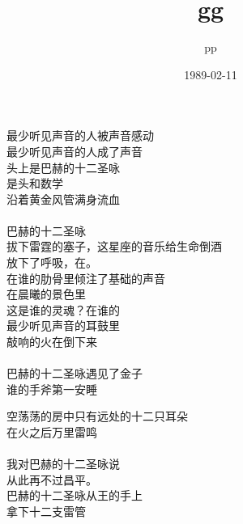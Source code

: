 \documentclass{article}
\title{gg}
\author{pp}
\date{1989-02-11}
\begin{document}

\maketitle

\setlength\parindent{0pt}

\begin{center}

\begin{minipage}{0.5\linewidth}

\Large

﻿最少听见声音的人被声音感动 \\
最少听见声音的人成了声音 \\
头上是巴赫的十二圣咏 \\
是头和数学 \\
沿着黄金风管满身流血 \\
 \\
巴赫的十二圣咏 \\
拔下雷霆的塞子，这星座的音乐给生命倒酒 \\
放下了呼吸，在。 \\
在谁的肋骨里倾注了基础的声音 \\
在晨曦的景色里 \\
这是谁的灵魂？在谁的 \\
最少听见声音的耳鼓里 \\
敲响的火在倒下来 \\
 \\
巴赫的十二圣咏遇见了金子 \\
谁的手斧第一安睡 \\

\end{minipage}

\newpage

\begin{minipage}{0.5\linewidth}

\Large

空荡荡的房中只有远处的十二只耳朵 \\
在火之后万里雷鸣 \\
 \\
我对巴赫的十二圣咏说 \\
从此再不过昌平。 \\
巴赫的十二圣咏从王的手上 \\
拿下十二支雷管\end{minipage}

\end{center}
\end{document}
